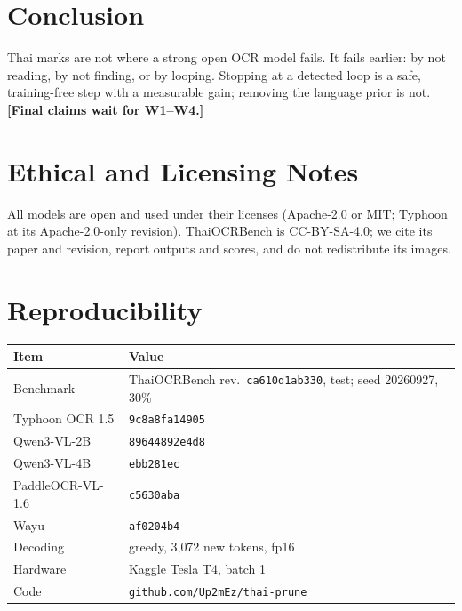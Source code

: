 \documentclass[10pt,twocolumn]{article}
\newcommand{\todo}[1]{\textcolor{red!70!black}{\textbf{[#1]}}}
\newcommand{\code}[1]{\texttt{#1}}
\begin{document}
\section{Conclusion}
Thai marks are not where a strong open OCR model fails. It fails earlier: by not reading, by not finding, or by looping. Stopping at a detected loop is a safe, training-free step with a measurable gain; removing the language prior is not. \todo{Final claims wait for W1--W4.}

\section*{Ethical and Licensing Notes}
All models are open and used under their licenses (Apache-2.0 or MIT; Typhoon at its Apache-2.0-only revision). ThaiOCRBench is CC-BY-SA-4.0; we cite its paper and revision, report outputs and scores, and do not redistribute its images.




\appendix
\section{Reproducibility}
\begin{table}[t]
\centering\footnotesize
\begin{tabular}{@{}ll@{}}
\toprule
Item & Value\\
\midrule
Benchmark & ThaiOCRBench rev.\ \code{ca610d1ab330}, test; seed 20260927, 30\%\\
Typhoon OCR 1.5 & \code{9c8a8fa14905}\\
Qwen3-VL-2B & \code{89644892e4d8}\\
Qwen3-VL-4B & \code{ebb281ec}\\
PaddleOCR-VL-1.6 & \code{c5630aba}\\
Wayu & \code{af0204b4}\\
Decoding & greedy, 3{,}072 new tokens, fp16\\
Hardware & Kaggle Tesla T4, batch 1\\
Code & \code{github.com/Up2mEz/thai-prune}\\
\bottomrule
\end{tabular}
\end{table}
\end{document}

